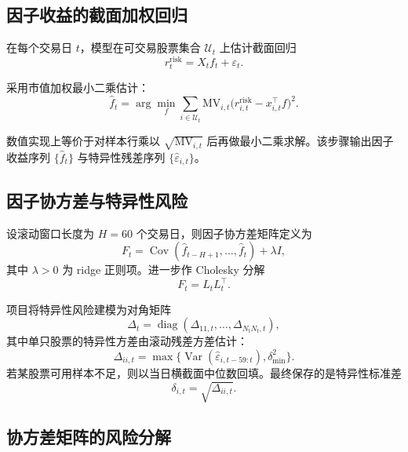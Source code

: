 \documentclass[12pt, a4paper, oneside]{article}
\newcommand{\Var}{\operatorname{Var}}
\newcommand{\Cov}{\operatorname{Cov}}
\newcommand{\diag}{\operatorname{diag}}
\begin{document}
\subsection{因子收益的截面加权回归}

在每个交易日 \(t\)，模型在可交易股票集合 \(\mathcal U_t\) 上估计截面回归
\begin{equation}
r_t^{\mathrm{risk}} = X_t f_t + \varepsilon_t.
\end{equation}

采用市值加权最小二乘估计：
\begin{equation}
\hat f_t = \arg\min_f \sum_{i\in\mathcal U_t}\mathrm{MV}_{i,t}\big(r_{i,t}^{\mathrm{risk}} - x_{i,t}^\top f\big)^2.
\end{equation}

数值实现上等价于对样本行乘以 \(\sqrt{\mathrm{MV}_{i,t}}\) 后再做最小二乘求解。该步骤输出因子收益序列 \(\{\hat f_t\}\) 与特异性残差序列 \(\{\hat\varepsilon_{i,t}\}\)。

\subsection{因子协方差与特异性风险}

设滚动窗口长度为 \(H=60\) 个交易日，则因子协方差矩阵定义为
\begin{equation}
F_t = \Cov(\hat f_{t-H+1},\dots,\hat f_t) + \lambda I,
\end{equation}
其中 \(\lambda>0\) 为 ridge 正则项。进一步作 Cholesky 分解
\begin{equation}
F_t = L_tL_t^\top.
\end{equation}

项目将特异性风险建模为对角矩阵
\begin{equation}
\Delta_t = \diag(\Delta_{11,t},\dots,\Delta_{N_tN_t,t}),
\end{equation}
其中单只股票的特异性方差由滚动残差方差估计：
\begin{equation}
\Delta_{ii,t} = \max\{\Var(\hat\varepsilon_{i,t-59:t}), \delta_{\min}^2\}.
\end{equation}
若某股票可用样本不足，则以当日横截面中位数回填。最终保存的是特异性标准差
\begin{equation}
\delta_{i,t} = \sqrt{\Delta_{ii,t}}.
\end{equation}

\subsection{协方差矩阵的风险分解}
\end{document}
